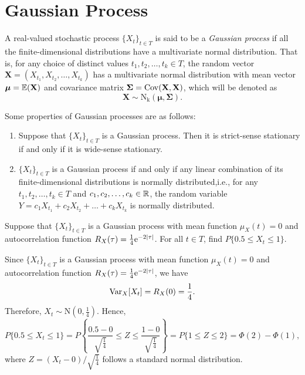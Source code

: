 \section{Gaussian Process}

\begin{definition}
  A real-valued stochastic process \(\{X_t\}_{t \in T}\) is said to be a \emph{Gaussian process} if all the finite-dimensional distributions have a multivariate normal distribution. That is, for any choice of distinct values \(t_1, t_2, \dots, t_k \in T\), the random vector \(\mathbf{X} = (X_{t_1}, X_{t_2}, \dots, X_{t_k})\) has a multivariate normal distribution with mean vector \(\boldsymbol{\mu} = \mathbb{E}(\mathbf{X})\) and covariance matrix \(\boldsymbol{\Sigma} = \mathrm{Cov}(\mathbf{X}, \mathbf{X})\), which will be denoted as
  \[
    \mathbf{X} \sim \mathrm{N_k}(\boldsymbol{\mu}, \boldsymbol{\Sigma}).
  \]
\end{definition}

\begin{proposition}
  Some properties of Gaussian processes are as follows:
  \begin{enumerate}
    \item Suppose that \(\{X_t\}_{t \in T}\) is a Gaussian process. Then it is strict-sense stationary if and only if it is wide-sense stationary.
    \item \(\{X_t\}_{t \in T}\) is a Gaussian process if and only if any linear combination of its finite-dimensional distributions is normally distributed,i.e., for any \(t_1, t_2, \dots, t_k \in T\) and \(c_1, c_2, \dots, c_k \in \mathbb{R}\), the random variable \(Y = c_1 X_{t_1} + c_2 X_{t_2} + \dots + c_k X_{t_k}\) is normally distributed.
  \end{enumerate}
\end{proposition}

\begin{example}
  Suppose that \(\{X_t\}_{t \in T}\) is a Gaussian process with mean function \(\mu_X(t) = 0\) and autocorrelation function \(R_X(\tau) = \frac{1}{4} \mathrm{e}^{-2|\tau|}\). For all \(t \in T\), find \(P\{0.5 \leq X_t \leq 1\}\).
\end{example}
\begin{solution}
  Since \(\{X_t\}_{t \in T}\) is a Gaussian process with mean function \(\mu_X(t) = 0\) and autocorrelation function \(R_X(\tau) = \frac{1}{4} \mathrm{e}^{-2|\tau|}\), we have
  \[
    \mathrm{Var}_X[X_t] = R_X(0) = \frac{1}{4}.
  \]
  Therefore, \(X_t \sim \mathrm{N}(0, \frac{1}{4})\). Hence,
  \[
    P\{0.5 \leq X_t \leq 1\} = P\left\{\frac{0.5 - 0}{\sqrt{\frac{1}{4}}} \leq Z \leq \frac{1 - 0}{\sqrt{\frac{1}{4}}}\right\} = P\{1 \leq Z \leq 2\} = \Phi(2) - \Phi(1),
  \]
  where \(Z = (X_t - 0)/\sqrt{\frac{1}{4}}\) follows a standard normal distribution.
\end{solution}

